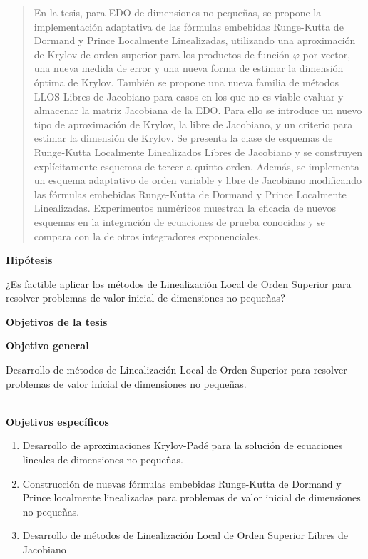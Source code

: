 \begin{abstract}
	En la tesis, para EDO de dimensiones no pequeñas, se propone la implementación adaptativa de las fórmulas embebidas Runge-Kutta de Dormand y Prince Localmente Linealizadas, utilizando una aproximación de Krylov de orden superior para los productos de función $\varphi$ por vector, una nueva medida de error y una nueva forma de estimar la dimensión óptima de Krylov. También se propone una nueva familia de métodos LLOS Libres de Jacobiano para casos en los que no es viable evaluar y almacenar la matriz Jacobiana de la EDO. Para ello se introduce un nuevo tipo de aproximación de Krylov, la libre de Jacobiano, y un criterio para estimar la dimensión de Krylov. Se presenta la clase de esquemas de Runge-Kutta Localmente Linealizados Libres de Jacobiano y se construyen explícitamente esquemas de tercer a quinto orden. Además, se implementa un esquema adaptativo de orden variable y libre de Jacobiano modificando las fórmulas embebidas Runge-Kutta de Dormand y Prince Localmente Linealizadas. Experimentos numéricos muestran la eficacia de nuevos esquemas en la integración de ecuaciones de prueba conocidas y se compara con la de otros integradores exponenciales.
\end{abstract}

\newpage

\begin{center}
	{\large \textbf{Hipótesis}}
\end{center}
¿Es factible aplicar los métodos de Linealización Local de Orden Superior para resolver problemas de valor inicial de dimensiones no pequeñas?

\qquad

\begin{center}
	{\large \textbf{Objetivos de la tesis}}
\end{center}
\textbf{Objetivo general}

Desarrollo de métodos de Linealización Local de Orden Superior para resolver problemas de valor inicial de dimensiones no pequeñas.

\qquad\\
\textbf{Objetivos específicos}

\begin{enumerate}
	\item Desarrollo de aproximaciones Krylov-Padé para la solución de ecuaciones lineales de dimensiones no pequeñas.
	\item Construcción de nuevas fórmulas embebidas Runge-Kutta de Dormand y Prince localmente linealizadas para problemas de valor inicial de dimensiones no pequeñas.
	\item Desarrollo de métodos de Linealización Local de Orden Superior Libres de Jacobiano
\end{enumerate}
